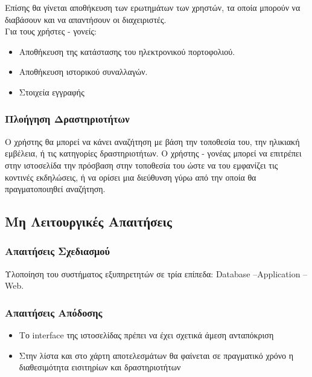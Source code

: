 \documentclass[letterpaper,6pt]{article}
\begin{document}
Επίσης θα γίνεται αποθήκευση των ερωτημάτων των χρηστών, τα οποία μπορούν να διαβάσουν και να απαντήσουν οι διαχειριστές.
~\\
Για τους χρήστες - γονείς:
\begin{itemize}
  \item Αποθήκευση της κατάστασης του ηλεκτρονικού πορτοφολιού.
    \item Αποθήκευση ιστορικού συναλλαγών.
    \item Στοιχεία εγγραφής
\end{itemize}

\subsubsection{Πλοήγηση Δραστηριοτήτων}

Ο χρήστης θα μπορεί να κάνει αναζήτηση με βάση την τοποθεσία του, την ηλικιακή εμβέλεια, ή τις κατηγορίες δραστηριοτήτων.
Ο χρήστης - γονέας μπορεί να επιτρέπει στην ιστοσελίδα την πρόσβαση στην τοποθεσία του ώστε να του εμφανίζει τις κοντινές εκδηλώσεις, ή να ορίσει μια διεύθυνση γύρω από την οποία θα πραγματοποιηθεί αναζήτηση.

\subsection{Μη Λειτουργικές Απαιτήσεις}

\subsubsection{Απαιτήσεις Σχεδιασμού}

  Υλοποίηση του συστήματος εξυπηρετητών σε τρία επίπεδα: Database –Application – Web. 
  
\subsubsection{Απαιτήσεις Απόδοσης}
  
\begin{itemize}
  \item Το interface της ιστοσελίδας πρέπει να έχει σχετικά άμεση ανταπόκριση 
  \item Στην λίστα και στο χάρτη αποτελεσμάτων θα φαίνεται σε πραγματικό χρόνο η διαθεσιμότητα εισιτηρίων και δραστηριοτήτων
\end{itemize}
\end{document}
